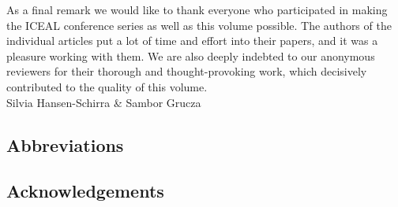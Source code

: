 \documentclass[output=paper]{langsci/langscibook}
\begin{document}
As a final remark we would like to thank everyone who participated in making the ICEAL conference series as well as this volume possible. The authors of the individual articles put a lot of time and effort into their papers, and it was a pleasure working with them. We are also deeply indebted to our anonymous reviewers for their thorough and thought-provoking work, which decisively contributed to the quality of this volume.\\

Silvia Hansen-Schirra \& Sambor Grucza



\subsection*{Abbreviations}
\subsection*{Acknowledgements}

\printbibliography[heading=subbibliography,notkeyword=this]
\end{document}
